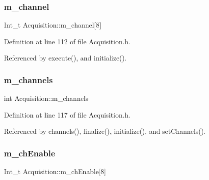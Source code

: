 \mbox{\label{classAcquisition_a1123502b520aec97ee8a71039abaa3fb}} 
\subsubsection{\texorpdfstring{m\+\_\+channel}{m\_channel}}
{\footnotesize\ttfamily Int\+\_\+t Acquisition\+::m\+\_\+channel\mbox{[}8\mbox{]}\hspace{0.3cm}{\ttfamily [private]}}



Definition at line 112 of file Acquisition.\+h.



Referenced by execute(), and initialize().

\mbox{\label{classAcquisition_aedc8b29f322ef00540797fbd0d5112d1}} 
\subsubsection{\texorpdfstring{m\+\_\+channels}{m\_channels}}
{\footnotesize\ttfamily int Acquisition\+::m\+\_\+channels\hspace{0.3cm}{\ttfamily [private]}}



Definition at line 117 of file Acquisition.\+h.



Referenced by channels(), finalize(), initialize(), and set\+Channels().

\mbox{\label{classAcquisition_ad323c9602565eec8e41f573d441745e2}} 
\subsubsection{\texorpdfstring{m\+\_\+ch\+Enable}{m\_chEnable}}
{\footnotesize\ttfamily Int\+\_\+t Acquisition\+::m\+\_\+ch\+Enable\mbox{[}8\mbox{]}\hspace{0.3cm}{\ttfamily [private]}}



